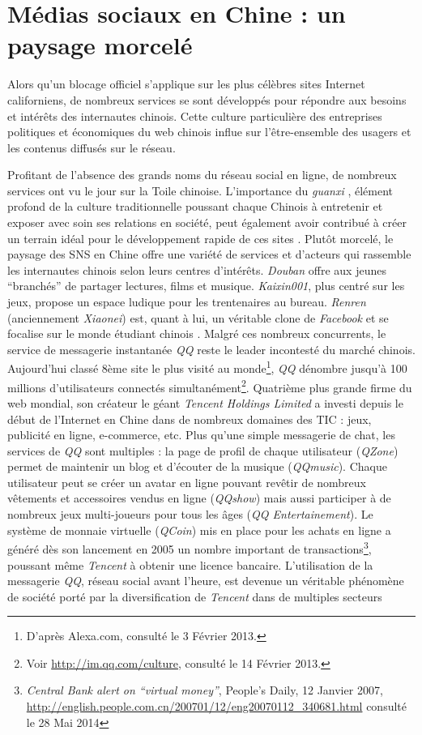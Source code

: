 \section[Médias sociaux en Chine : un paysage morcelé]{Médias sociaux en Chine : un paysage morcelé}

Alors qu’un blocage officiel s’applique sur les plus célèbres sites Internet californiens, de nombreux services se sont développés pour répondre aux besoins et intérêts des internautes chinois. Cette culture particulière des entreprises politiques et économiques du web chinois influe sur l’être-ensemble des usagers et les contenus diffusés sur le réseau.

Profitant de l’absence des grands noms du réseau social en ligne, de nombreux services ont vu le jour sur la Toile chinoise. L'importance du \textit{guanxi} \citep{Yu2008}, élément profond de la culture traditionnelle poussant chaque Chinois à entretenir et exposer avec soin ses relations en société, peut également avoir contribué à créer un terrain idéal pour le développement rapide de ces sites \citep{Yang2011b}. Plutôt morcelé, le paysage des SNS en Chine offre une variété de services et d’acteurs qui rassemble les internautes chinois selon leurs centres d'intérêts. \textit{Douban} offre aux jeunes ``branchés'' de partager lectures, films et musique. \textit{Kaixin001}, plus centré sur les jeux, propose un espace ludique pour les trentenaires au bureau. \textit{Renren} (anciennement \textit{Xiaonei}) est, quant à lui, un véritable clone de \textit{Facebook} et se focalise sur le monde étudiant chinois \citep{Renaud2011}. Malgré ces nombreux concurrents, le service de messagerie instantanée \textit{QQ} reste le leader incontesté du marché chinois. Aujourd’hui classé 8ème site le plus visité au monde\footnote{D’après Alexa.com, consulté le 3 Février 2013.}, \textit{QQ} dénombre jusqu’à 100 millions d’utilisateurs connectés simultanément\footnote{Voir \url{http://im.qq.com/culture}, consulté le 14 Février 2013.}. Quatrième plus grande firme du web mondial, son créateur le géant \textit{Tencent Holdings Limited} a investi depuis le début de l’Internet en Chine dans de nombreux domaines des TIC : jeux, publicité en ligne, e-commerce, etc. Plus qu’une simple messagerie de chat, les services de \textit{QQ} sont multiples : la page de profil de chaque utilisateur (\textit{QZone}) permet de maintenir un blog et d’écouter de la musique (\textit{QQmusic}). Chaque utilisateur peut se créer un avatar en ligne pouvant revêtir de nombreux vêtements et accessoires vendus en ligne (\textit{QQshow}) mais aussi participer à de nombreux jeux multi-joueurs pour tous les âges (\textit{QQ Entertainement}). Le système de monnaie virtuelle (\textit{QCoin}) mis en place pour les achats en ligne a généré dès son lancement en 2005 un nombre important de transactions\footnote{\textit{Central Bank alert on ``virtual money''}, People’s Daily, 12 Janvier 2007, \url{http://english.people.com.cn/200701/12/eng20070112_340681.html} consulté le 28 Mai 2014}, poussant même \textit{Tencent} à obtenir une licence bancaire. L’utilisation de la messagerie \textit{QQ}, réseau social avant l’heure, est devenue un véritable phénomène de société porté par la diversification de \textit{Tencent} dans de multiples secteurs 